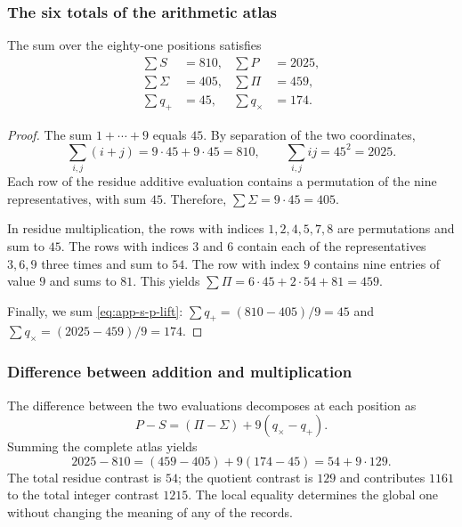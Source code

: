 \subsubsection{The six totals of the arithmetic atlas}

\begin{bloqueindivisible}
\begin{proposicion}
\label{prop:app-totales}
The sum over the eighty-one positions satisfies
\begin{align}
 \sum S&=810, &\sum P&=2025,\\
 \sum\Sigma&=405, &\sum\Pi&=459,\\
 \sum q_+&=45, &\sum q_\times&=174.
 \label{eq:app-six-totals}
\end{align}
\end{proposicion}

\begin{proof}
The sum $1+\cdots+9$ equals $45$. By separation of the two coordinates,
\[
 \sum_{i,j}(i+j)=9\cdot45+9\cdot45=810,
 \qquad \sum_{i,j}ij=45^2=2025.
\]
Each row of the residue additive evaluation contains a permutation of the nine representatives, with sum $45$. Therefore, $\sum\Sigma=9\cdot45=405$.

In residue multiplication, the rows with indices $1,2,4,5,7,8$ are permutations and sum to $45$. The rows with indices $3$ and $6$ contain each of the representatives $3,6,9$ three times and sum to $54$. The row with index $9$ contains nine entries of value $9$ and sums to $81$. This yields $\sum\Pi=6\cdot45+2\cdot54+81=459$.

Finally, we sum \eqref{eq:app-s-p-lift}: $\sum q_+=(810-405)/9=45$ and $\sum q_\times=(2025-459)/9=174$.
\end{proof}
\end{bloqueindivisible}



\subsubsection{Difference between addition and multiplication}

The difference between the two evaluations decomposes at each position as
\begin{equation}
 P-S=(\Pi-\Sigma)+9(q_\times-q_+).
 \label{eq:app-difference-local}
\end{equation}
Summing the complete atlas yields
\begin{equation}
 2025-810=(459-405)+9(174-45)=54+9\cdot129.
 \label{eq:app-difference-global}
\end{equation}
The total residue contrast is $54$; the quotient contrast is $129$ and contributes $1161$ to the total integer contrast $1215$. The local equality determines the global one without changing the meaning of any of the records.

